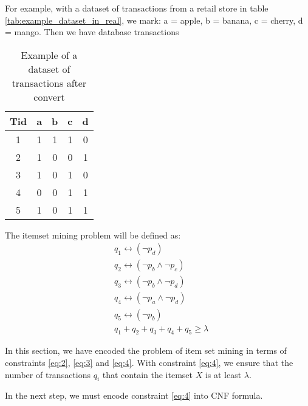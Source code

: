 For example, with a dataset of transactions from a retail store in table \ref{tab:example_dataset_in_real}, we mark:
a = apple, b = banana, c = cherry, d = mango. Then we have database transactions

\begin{table}[H]
    \centering
    \caption{Example of a dataset of transactions after convert}
    \label{tab:example_dataset_after_convert}
    \begin{tabular}{|c| c c c c |}
        \hline
        \textbf{Tid} & \textbf{a} & \textbf{b} & \textbf{c} & \textbf{d} \\
        \hline
        1            & 1          & 1          & 1          & 0          \\
        2            & 1          & 0          & 0          & 1          \\
        3            & 1          & 0          & 1          & 0          \\
        4            & 0          & 0          & 1          & 1          \\
        5            & 1          & 0          & 1          & 1          \\
        \hline
    \end{tabular}
\end{table}

The itemset mining problem will be defined as:
\begin{equation*}
    \begin{aligned}
         & q_1 \leftrightarrow (\neg p_d                ) \\
         & q_2 \leftrightarrow (\neg p_b \wedge \neg p_c) \\
         & q_3 \leftrightarrow (\neg p_b \wedge \neg p_d) \\
         & q_4 \leftrightarrow (\neg p_a \wedge \neg p_d) \\
         & q_5 \leftrightarrow (\neg p_b                ) \\
         & q_1 + q_2 + q_3 + q_4 + q_5 \geq \lambda
    \end{aligned}
\end{equation*}


In this section, we have encoded the problem of item set mining in terms of constraints \ref{eq:2}, \ref{eq:3} and \ref{eq:4}.
With constraint \ref{eq:4}, we ensure that the number of transactions $q_i$ that contain the itemset $X$ is at least $\lambda$.

In the next step, we must encode constraint \ref{eq:4} into CNF formula.
